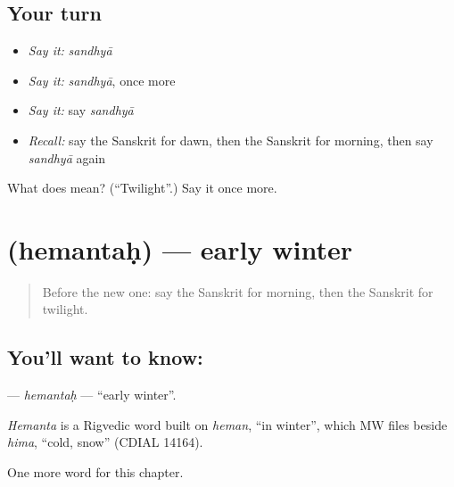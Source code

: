 \subsection*{Your turn}
\begin{itemize}
\raggedright
  \item \emph{Say it:} \emph{sandhyā}
  \item \emph{Say it:} \emph{sandhyā}, once more
  \item \emph{Say it:} say \emph{sandhyā}
  \item \emph{Recall:} say the Sanskrit for dawn, then the Sanskrit for morning, then say \emph{sandhyā} again
\end{itemize}

\begin{tcolorbox}[breakable,colback=teal!4,colframe=teal!35!black,title={Before you move on}]
What does  mean? (\textquotedblleft{}Twilight\textquotedblright{}.) Say it once more.
\end{tcolorbox}
\section[\texorpdfstring{\sk{हेमन्तः} (hemantaḥ)}{हेमन्तः (hemantaḥ)}]{ (hemantaḥ) — early winter}

\label{lesson:SA-C91-hemantah}



\begin{quote}
Before the new one: say the Sanskrit for morning, then the Sanskrit for twilight.
\end{quote}

\subsection*{You'll want to know: }
\textbf{} — \emph{hemantaḥ} — \textquotedblleft{}early winter\textquotedblright{}.

\begin{cousinweb}
\emph{Hemanta} is a Rigvedic word built on \emph{heman}, \textquotedblleft{}in winter\textquotedblright{}, which MW files beside \emph{hima}, \textquotedblleft{}cold, snow\textquotedblright{} (CDIAL 14164).
\end{cousinweb}

\begin{grammarlens}[title={What you've built}]
One more word for this chapter.
\end{grammarlens}

